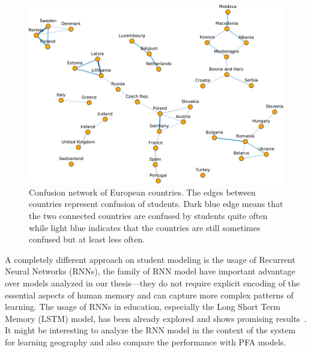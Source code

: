 \begin{figure}[htbp]
  \centering
  \includegraphics[width=\textwidth]{img/confusion-network}
  \caption{Confusion network of European countries. The edges between countries represent confusion of students. Dark blue edge means that the two connected countries are confused by students quite often while light blue indicates that the countries are still sometimes confused but at least less often.}
  \label{fig:confusion-network}
\end{figure}

A completely different approach on student modeling is the usage of Recurrent Neural Networks (RNNs), the family of RNN model have important advantage over models analyzed in our thesis---they do not require explicit encoding of the essential aspects of human memory and can capture more complex patterns of learning. The usage of RNNs in education, especially the Long Short Term Memory (LSTM) model, has been already explored and shows promising results~\cite{piech2015deep}. It might be interesting to analyze the RNN model in the context of the system for learning geography and also compare the performance with PFA models.
